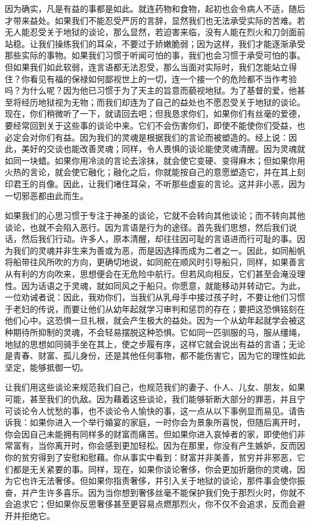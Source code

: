 因为确实，凡是有益的事都是如此。就连药物和食物，起初也会令病人不适，随后才带来益处。如果我们不能忍受严厉的言辞，显然我们也无法承受实际的苦难。若无人能忍受关于地狱的谈论，那么显然，若迫害来临，没有人能在烈火和刀剑面前站稳。让我们操练我们的耳朵，不要过于娇嫩脆弱；因为这样，我们才能逐渐承受那些实际的事物。如果我们习惯于听闻可怕的事，我们也会习惯于承受可怕的事。但如果我们如此软弱，连言语都无法忍受，那么当面对实际时，我们怎能站立得住？你看见有福的保禄如何鄙视世上的一切，连一个接一个的危险都不当作考验吗？为什么呢？因为他已习惯于为了天主的旨意而藐视地狱。为了基督的爱，他甚至将经历地狱视为无物；而我们却连为了自己的益处也不愿忍受关于地狱的谈论。现在，你们稍微听了一下，就请回去吧；但我恳求你们，如果你们有丝毫的爱德，要经常回到关于这些事的谈论中来。它们不会伤害你们，即使不能使你们受益，也必定会对你们有益。因为我们的灵魂是根据我们的言论而被塑造的。经上说：因此，美好的交谈也能改善灵魂；同样，令人畏惧的谈论能使灵魂清醒。因为灵魂就如同一块蜡。如果你用冷淡的言论去涂抹，就会使它变硬、变得麻木；但如果你用火热的言论，就会使它融化；融化之后，你就能按自己的意愿塑造它，并在其上刻印君王的肖像。因此，让我们堵住耳朵，不听那些虚妄的言论。这并非小恶，因为一切邪恶都由此而生。\par

如果我们的心思习惯于专注于神圣的谈论，它就不会转向其他谈论；而不转向其他谈论，也就不会陷入恶行。因为言语是行为的途径。首先我们思想，然后我们说话，然后我们行动。许多人，原本清醒，却往往因可耻的言语进而行可耻的事。因为我们的灵魂并非生来为善或为恶，而是因选择而成为二者之一。因此，如同船帆将船带往风所吹的方向，更确切地说，如同舵在顺风时引导船只，同样，如果善言从有利的方向吹来，思想便会在无危险中航行。但若风向相反，它们甚至会淹没理性。因为话语之于灵魂，就如同风之于船只。你愿意，就能移动并转动它。为此，一位劝诫者说：因此，我劝你们，当我们从乳母手中接过孩子时，不要让他们习惯于老妇的传说，而要让他们从幼年起就学习审判和惩罚的存在；要把这恐惧铭刻在他们心中。这恐惧一旦扎根，就会产生极大的益处。因为一个从幼年起就学会被这种期待所抑制的灵魂，不会轻易摆脱这种恐惧。它如同一匹驯服的马，服从缰绳，地狱的思想如同骑手坐在其上，使之步履有序，这样它就会说出有益的言语；无论是青春、财富、孤儿身份，还是其他任何事物，都不能伤害它，因为它的理性如此坚定，能够抵御一切。\par

让我们用这些谈论来规范我们自己，也规范我们的妻子、仆人、儿女、朋友，如果可能，甚至我们的仇敌。因为藉着这些谈论，我们能够斩断大部分的罪恶，并且宁可谈论令人忧愁的事，也不谈论令人愉快的事，这一点从以下事例显而易见。请告诉我：如果你进入一个举行婚宴的家庭，一时你会为景象所喜悦，但随后离开时，你会因自己未能拥有同样多的财富而痛苦。但如果你进入哀悼者的家，即使他们非常富有，当你离开时，你会感到更加轻松。因为在那里，你没有产生嫉妒，反而因你的贫穷得到了安慰和慰藉。你从事实中看到：财富并非美善，贫穷并非邪恶，它们都是无关紧要的事。同样，现在，如果你谈论奢侈，你会更加折磨你的灵魂，因为它也许无法奢侈。但如果你指责奢侈，并引入关于地狱的谈论，那件事会使你振奋，并产生许多喜乐。因为当你想到奢侈丝毫不能保护我们免于那烈火时，你就不会追求它；但如果你反思奢侈甚至更容易点燃那烈火，你不仅不会追求，反而会避开并拒绝它。\par


